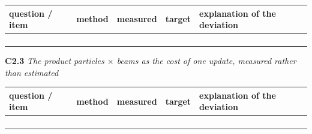 \documentclass[a4paper,10pt]{article}
\begin{document}
\begin{tabular}{|>{\raggedright\hyphenpenalty 500\arraybackslash}p{2.87cm}|>{\raggedright\hyphenpenalty 500\arraybackslash}p{2.28cm}|>{\raggedright\hyphenpenalty 500\arraybackslash}p{2.87cm}|>{\raggedright\hyphenpenalty 500\arraybackslash}p{2.28cm}|>{\raggedright\hyphenpenalty 500\arraybackslash}p{3.70cm}|}
\hline
\textbf{question / item} & \textbf{method} & \textbf{measured} & \textbf{target} & \textbf{explanation of the deviation} \\
\hline
\rule{0pt}{2.4em} & \rule{0pt}{2.4em} & \rule{0pt}{2.4em} & \rule{0pt}{2.4em} & \rule{0pt}{2.4em} \\
\rule{0pt}{2.4em} & \rule{0pt}{2.4em} & \rule{0pt}{2.4em} & \rule{0pt}{2.4em} & \rule{0pt}{2.4em} \\
\rule{0pt}{2.4em} & \rule{0pt}{2.4em} & \rule{0pt}{2.4em} & \rule{0pt}{2.4em} & \rule{0pt}{2.4em} \\
\rule{0pt}{2.4em} & \rule{0pt}{2.4em} & \rule{0pt}{2.4em} & \rule{0pt}{2.4em} & \rule{0pt}{2.4em} \\
\hline
\end{tabular}

\vspace{4pt}\noindent\textbf{C2.3} \emph{The product particles \(\times\) beams as the cost of one update, measured rather than estimated}

\begin{tabular}{|>{\raggedright\hyphenpenalty 500\arraybackslash}p{2.87cm}|>{\raggedright\hyphenpenalty 500\arraybackslash}p{2.28cm}|>{\raggedright\hyphenpenalty 500\arraybackslash}p{2.87cm}|>{\raggedright\hyphenpenalty 500\arraybackslash}p{2.28cm}|>{\raggedright\hyphenpenalty 500\arraybackslash}p{3.70cm}|}
\hline
\textbf{question / item} & \textbf{method} & \textbf{measured} & \textbf{target} & \textbf{explanation of the deviation} \\
\hline
\rule{0pt}{2.4em} & \rule{0pt}{2.4em} & \rule{0pt}{2.4em} & \rule{0pt}{2.4em} & \rule{0pt}{2.4em} \\
\rule{0pt}{2.4em} & \rule{0pt}{2.4em} & \rule{0pt}{2.4em} & \rule{0pt}{2.4em} & \rule{0pt}{2.4em} \\
\rule{0pt}{2.4em} & \rule{0pt}{2.4em} & \rule{0pt}{2.4em} & \rule{0pt}{2.4em} & \rule{0pt}{2.4em} \\
\rule{0pt}{2.4em} & \rule{0pt}{2.4em} & \rule{0pt}{2.4em} & \rule{0pt}{2.4em} & \rule{0pt}{2.4em} \\
\hline
\end{tabular}
\end{document}
